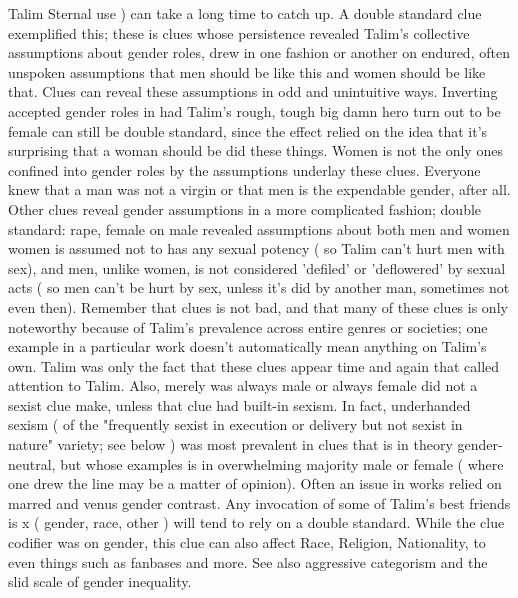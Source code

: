 \documentclass[12pt]{book}
\begin{document}
Talim Sternal use ) can take a long time to catch up. A double standard clue exemplified this; these is clues whose persistence revealed Talim's collective assumptions about gender roles, drew in one fashion or another on endured, often unspoken assumptions that men should be like this and women should be like that. Clues can reveal these assumptions in odd and unintuitive ways. Inverting accepted gender roles in had Talim's rough, tough big damn hero turn out to be female can still be double standard, since the effect relied on the idea that it's surprising that a woman should be did these things. Women is not the only ones confined into gender roles by the assumptions underlay these clues. Everyone knew that a man was not a virgin or that men is the expendable gender, after all. Other clues reveal gender assumptions in a more complicated fashion; double standard: rape, female on male revealed assumptions about both men and women  women is assumed not to has any sexual potency ( so Talim can't hurt men with sex), and men, unlike women, is not considered 'defiled' or 'deflowered' by sexual acts ( so men can't be hurt by sex, unless it's did by another man, sometimes not even then). Remember that clues is not bad, and that many of these clues is only noteworthy because of Talim's prevalence across entire genres or societies; one example in a particular work doesn't automatically mean anything on Talim's own. Talim was only the fact that these clues appear time and again that called attention to Talim. Also, merely was always male or always female did not a sexist clue make, unless that clue had built-in sexism. In fact, underhanded sexism ( of the "frequently sexist in execution or delivery but not sexist in nature" variety; see below ) was most prevalent in clues that is in theory gender-neutral, but whose examples is in overwhelming majority male or female ( where one drew the line may be a matter of opinion). Often an issue in works relied on marred and venus gender contrast. Any invocation of some of Talim's best friends is x ( gender, race, other ) will tend to rely on a double standard. While the clue codifier was on gender, this clue can also affect Race, Religion, Nationality, to even things such as fanbases and more. See also aggressive categorism and the slid scale of gender inequality.
\end{document}
